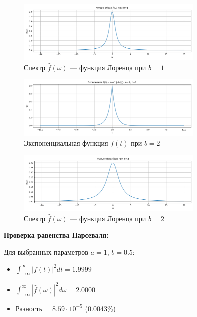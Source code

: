 \begin{figure}[H]
    \centering
    \includegraphics[width=0.8\textwidth]{exp_spectrum_b1.png}
    \caption{Спектр $\hat{f}(\omega)$ — функция Лоренца при $b = 1$}
\end{figure}

\begin{figure}[H]
    \centering
    \includegraphics[width=0.8\textwidth]{exp_function_b2.png}
    \caption{Экспоненциальная функция $f(t)$ при $b = 2$}
\end{figure}

\begin{figure}[H]
    \centering
    \includegraphics[width=0.8\textwidth]{exp_spectrum_b2.png}
    \caption{Спектр $\hat{f}(\omega)$ — функция Лоренца при $b = 2$}
\end{figure}

\textbf{Проверка равенства Парсеваля:}

Для выбранных параметров $a = 1$, $b = 0.5$:
\begin{itemize}
    \item $\displaystyle \int_{-\infty}^{\infty} |f(t)|^2 dt = 1.9999$
    \item $\displaystyle \int_{-\infty}^{\infty} |\hat{f}(\omega)|^2 d\omega = 2.0000$
    \item Разность = $8.59 \cdot 10^{-5}$ (0.0043\%)
\end{itemize}

